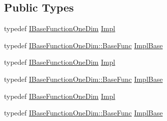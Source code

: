 \subsection*{Public Types}
\begin{DoxyCompactItemize}
\item 
typedef \mbox{\hyperlink{classROOT_1_1Math_1_1IBaseFunctionOneDim}{I\+Base\+Function\+One\+Dim}} \mbox{\hyperlink{classROOT_1_1Math_1_1Functor1D_ae7e0743edafd220a53b994cbbfbd7a9a}{Impl}}
\item 
typedef \mbox{\hyperlink{classROOT_1_1Math_1_1IBaseFunctionOneDim_a87fee465cea6b03c55aa6bc1cf641cc9}{I\+Base\+Function\+One\+Dim\+::\+Base\+Func}} \mbox{\hyperlink{classROOT_1_1Math_1_1Functor1D_a1ade2017edb7db0cbaf9a27a864f4dd3}{Impl\+Base}}
\item 
typedef \mbox{\hyperlink{classROOT_1_1Math_1_1IBaseFunctionOneDim}{I\+Base\+Function\+One\+Dim}} \mbox{\hyperlink{classROOT_1_1Math_1_1Functor1D_ae7e0743edafd220a53b994cbbfbd7a9a}{Impl}}
\item 
typedef \mbox{\hyperlink{classROOT_1_1Math_1_1IBaseFunctionOneDim_a87fee465cea6b03c55aa6bc1cf641cc9}{I\+Base\+Function\+One\+Dim\+::\+Base\+Func}} \mbox{\hyperlink{classROOT_1_1Math_1_1Functor1D_a1ade2017edb7db0cbaf9a27a864f4dd3}{Impl\+Base}}
\item 
typedef \mbox{\hyperlink{classROOT_1_1Math_1_1IBaseFunctionOneDim}{I\+Base\+Function\+One\+Dim}} \mbox{\hyperlink{classROOT_1_1Math_1_1Functor1D_ae7e0743edafd220a53b994cbbfbd7a9a}{Impl}}
\item 
typedef \mbox{\hyperlink{classROOT_1_1Math_1_1IBaseFunctionOneDim_a87fee465cea6b03c55aa6bc1cf641cc9}{I\+Base\+Function\+One\+Dim\+::\+Base\+Func}} \mbox{\hyperlink{classROOT_1_1Math_1_1Functor1D_a1ade2017edb7db0cbaf9a27a864f4dd3}{Impl\+Base}}
\end{DoxyCompactItemize}
